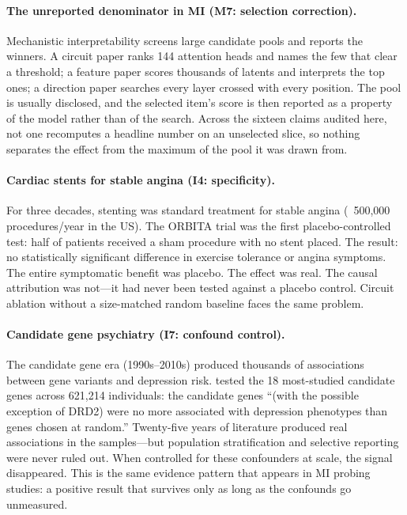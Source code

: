 \documentclass{article}
\begin{document}
\paragraph{The unreported denominator in MI (M7: selection correction).}
Mechanistic interpretability screens large candidate pools and reports the
winners.  A circuit paper ranks 144 attention heads and names the few that clear a
threshold; a feature paper scores thousands of latents and interprets the top ones;
a direction paper searches every layer crossed with every position.  The pool is
usually disclosed, and the selected item's score is then reported as a property of
the model rather than of the search.  Across the sixteen claims audited here, not
one recomputes a headline number on an unselected slice, so nothing separates the
effect from the maximum of the pool it was drawn from.

\paragraph{Cardiac stents for stable angina (I4: specificity).}
For three decades, stenting was standard treatment for stable angina (~500,000 procedures/year in the US). The ORBITA trial \citep{alhabib2018orbita} was the first placebo-controlled test: half of patients received a sham procedure with no stent placed. The result: no statistically significant difference in exercise tolerance or angina symptoms. The entire symptomatic benefit was placebo. The effect was real. The causal attribution was not---it had never been tested against a placebo control. Circuit ablation without a size-matched random baseline faces the same problem.

\paragraph{Candidate gene psychiatry (I7: confound control).}
The candidate gene era (1990s--2010s) produced thousands of associations between gene variants and depression risk. \citet{border2019no} tested the 18 most-studied candidate genes across 621,214 individuals: the candidate genes ``(with the possible exception of DRD2) were no more associated with depression phenotypes than genes chosen at random.'' Twenty-five years of literature produced real associations in the samples---but population stratification and selective reporting were never ruled out. When \citet{border2019no} controlled for these confounders at scale, the signal disappeared. This is the same evidence pattern that appears in MI probing studies: a positive result that survives only as long as the confounds go unmeasured.
\end{document}
